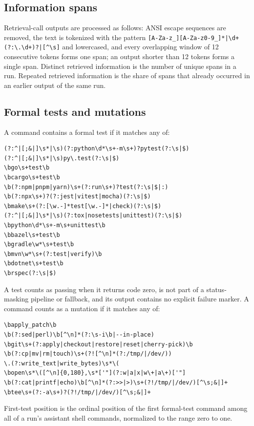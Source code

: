 \subsection{Information spans}
\label{app:spans}

Retrieval-call outputs are processed as follows: ANSI escape sequences are removed, the text is tokenized with the pattern \verb![A-Za-z_][A-Za-z0-9_]*|\d+(?:\.\d+)?|[^\s]! and lowercased, and every overlapping window of 12 consecutive tokens forms one span; an output shorter than 12 tokens forms a single span. Distinct retrieved information is the number of unique spans in a run. Repeated retrieved information is the share of spans that already occurred in an earlier output of the same run.

\subsection{Formal tests and mutations}
\label{app:tests}

A command contains a formal test if it matches any of:

\begin{verbatim}
(?:^|[;&|]\s*|\s)(?:python\d*\s+-m\s+)?pytest(?:\s|$)
(?:^|[;&|]\s*|\s)py\.test(?:\s|$)
\bgo\s+test\b
\bcargo\s+test\b
\b(?:npm|pnpm|yarn)\s+(?:run\s+)?test(?:\s|$|:)
\b(?:npx\s+)?(?:jest|vitest|mocha)(?:\s|$)
\bmake\s+(?:[\w.-]*test[\w.-]*|check)(?:\s|$)
(?:^|[;&|]\s*|\s)(?:tox|nosetests|unittest)(?:\s|$)
\bpython\d*\s+-m\s+unittest\b
\bbazel\s+test\b
\bgradle\w*\s+test\b
\bmvn\w*\s+(?:test|verify)\b
\bdotnet\s+test\b
\brspec(?:\s|$)
\end{verbatim}

A test counts as passing when it returns code zero, is not part of a status-masking pipeline or fallback, and its output contains no explicit failure marker. A command counts as a mutation if it matches any of:

\begin{verbatim}
\bapply_patch\b
\b(?:sed|perl)\b[^\n]*(?:\s-i\b|--in-place)
\bgit\s+(?:apply|checkout|restore|reset|cherry-pick)\b
\b(?:cp|mv|rm|touch)\s+(?![^\n]*(?:/tmp/|/dev/))
\.(?:write_text|write_bytes)\s*\(
\bopen\s*\([^\n]{0,180},\s*['"](?:w|a|x|w\+|a\+)['"]
\b(?:cat|printf|echo)\b[^\n]*(?:>>|>)\s+(?!/tmp/|/dev/)[^\s;&|]+
\btee\s+(?:-a\s+)?(?!/tmp/|/dev/)[^\s;&|]+
\end{verbatim}

First-test position is the ordinal position of the first formal-test command among all of a run's assistant shell commands, normalized to the range zero to one.

